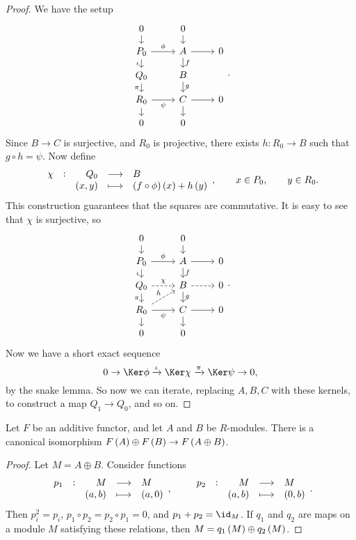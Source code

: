 \begin{proof}
We have the setup
$$
\begin{tikzcd}[row sep=small]
0 \arrow{d} & 0 \arrow{d} & \\
P_0 \arrow{r}{\phi} \arrow[swap]{d}{\iota} & A \arrow{r} \arrow{d}{f} & 0 \\
Q_0 \arrow[swap]{d}{\pi} & B \arrow{d}{g} & \\
R_0 \arrow[swap]{r}{\psi} \arrow{d} & C \arrow{r} \arrow{d} & 0 \\
0 & 0 &
\end{tikzcd}.
$$
Since $ B \to C $ is surjective, and $ R_0 $ is projective, there exists $ h : R_0 \to B $ such that $ g \circ h = \psi $. Now define
$$ \function[\chi]{Q_0}{B}{\br{x, y}}{\br{f \circ \phi}\br{x} + h\br{y}}, \qquad x \in P_0, \qquad y \in R_0. $$
This construction guarantees that the squares are commutative. It is easy to see that $ \chi $ is surjective, so
$$
\begin{tikzcd}[row sep=small]
0 \arrow{d} & 0 \arrow{d} & \\
P_0 \arrow{r}{\phi} \arrow[swap]{d}{\iota} & A \arrow{r} \arrow{d}{f} & 0 \\
Q_0 \arrow[dashed]{r}{\chi} \arrow[swap]{d}{\pi} & B \arrow[dashed]{r} \arrow{d}{g} & 0 \\
R_0 \arrow[dashed]{ur}{h} \arrow[swap]{r}{\psi} \arrow{d} & C \arrow{r} \arrow{d} & 0 \\
0 & 0 &
\end{tikzcd}.
$$
Now we have a short exact sequence
$$ 0 \to \Ker \phi \xrightarrow{\iota} \Ker \chi \xrightarrow{\pi} \Ker \psi \to 0, $$
by the snake lemma. So now we can iterate, replacing $ A, B, C $ with these kernels, to construct a map $ Q_1 \to Q_0 $, and so on.
\end{proof}

\pagebreak

\begin{proposition}
Let $ F $ be an additive functor, and let $ A $ and $ B $ be $ R $-modules. There is a canonical isomorphism $ F\br{A} \oplus F\br{B} \to F\br{A \oplus B} $.
\end{proposition}

\begin{proof}
Let $ M = A \oplus B $. Consider functions
$$ \function[p_1]{M}{M}{\br{a, b}}{\br{a, 0}}, \qquad \function[p_2]{M}{M}{\br{a, b}}{\br{0, b}}. $$
Then $ p_i^2 = p_i $, $ p_1 \circ p_2 = p_2 \circ p_1 = 0 $, and $ p_1 + p_2 = \id_M $. If $ q_1 $ and $ q_2 $ are maps on a module $ M $ satisfying these relations, then $ M = q_1\br{M} \oplus q_2\br{M} $.
\end{proof}

